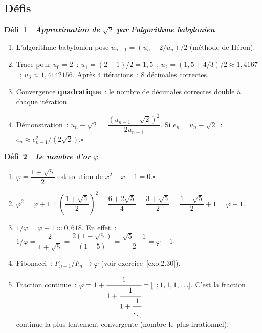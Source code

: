 \subsection*{D\'efis}

\noindent{}
{\color{BO}\bfseries\small D\'efi~1~\textendash\ \textit{Approximation de $\sqrt{2}$ par l'algorithme babylonien}}
\par\smallskip

\begin{enumerate}
  \item L'algorithme babylonien pose $u_{n+1}=(u_n+2/u_n)/2$ (m\'ethode de H\'eron).
  \item Trace pour $u_0=2$~:
        $u_1=(2+1)/2=1{,}5$~;
        $u_2=(1{,}5+4/3)/2\approx1{,}4167$~;
        $u_3\approx1{,}4142156$.
        Apr\`es $4$ it\'erations~: $8$ d\'ecimales correctes.
  \item Convergence \textbf{quadratique}~: le nombre de d\'ecimales correctes double \`a
        chaque it\'eration.
  \item D\'emonstration~: $u_n-\sqrt{2}=\dfrac{(u_{n-1}-\sqrt{2})^2}{2u_{n-1}}$.
        Si $e_n=u_n-\sqrt{2}$~: $e_n\approx e_{n-1}^2/(2\sqrt{2})$.\hfill$\square$
\end{enumerate}

\noindent{}
{\color{BO}\bfseries\small D\'efi~2~\textendash\ \textit{Le nombre d'or $\varphi$}}
\par\smallskip

\begin{enumerate}
  \item $\varphi=\dfrac{1+\sqrt{5}}{2}$ est solution de $x^2-x-1=0$.\hfill$\square$
  \item $\varphi^2=\varphi+1$~: $\left(\dfrac{1+\sqrt{5}}{2}\right)^2=\dfrac{6+2\sqrt{5}}{4}=\dfrac{3+\sqrt{5}}{2}=\dfrac{1+\sqrt{5}}{2}+1=\varphi+1$.\checkmark
  \item $1/\varphi=\varphi-1\approx0{,}618$. En effet~: $1/\varphi=\dfrac{2}{1+\sqrt{5}}=\dfrac{2(1-\sqrt{5})}{(1-5)}=\dfrac{\sqrt{5}-1}{2}=\varphi-1$.
  \item Fibonacci~: $F_{n+1}/F_n\to\varphi$ (voir exercice~\ref{exo:2.30}).
  \item Fraction continue~: $\varphi=1+\cfrac{1}{1+\cfrac{1}{1+\cfrac{1}{\ddots}}}=[1;1,1,1,\ldots]$.
        C'est la fraction continue la plus lentement convergente (nombre le plus irrationnel).
\end{enumerate}

